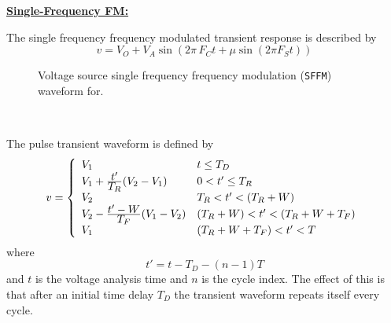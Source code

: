 \noindent\underline{\bf Single-Frequency FM:}
\\[0.2in]


The single frequency frequency modulated transient response is described by
\begin{equation}
v = V_O + V_A\sin{(2 \pi \, F_C t +  \mu\sin{(2 \pi F_S t)})}
\end{equation}
\begin{figure}[hbp]
\centering

\caption[Voltage source single frequency frequency modulation ({\tt SFFM})
waveform]{Voltage source single frequency frequency modulation ({\tt SFFM})
waveform for\newline \hspace*{\fill}{\tt SFFM(0.2 0.7 4 0.9 1)}\hspace*{\fill}.
\label{fig:vsffm}}
\end{figure}

\\[0.2in]

The pulse transient waveform is defined by
\begin{equation}
v = \left\{ \begin{array}{ll}
V_1                         & t \le T_D\\
V_1 + {{\textstyle t'} \over {\textstyle T_R}} ({V_2}-{V_1})&0<t' \le T_R\\
V_2                         &{T_R} < t'< (T_R+W)\\
V_2 - {{\textstyle t'-W} \over {\textstyle T_F}} (V_1-V_2)
                   &(T_R+W) < t' < (T_R+W+T_F)\\
V_1           &(T_R+W+T_F) < t' < T
     \end{array} \right. %
\end{equation}
where
\begin{equation}
t' = t - T_D -(n-1)T
\end{equation}
and $t$ is the voltage analysis time and $n$ is the cycle index.  The effect
of this is that after an initial time delay $T_D$ the transient waveform
repeats itself every cycle.

